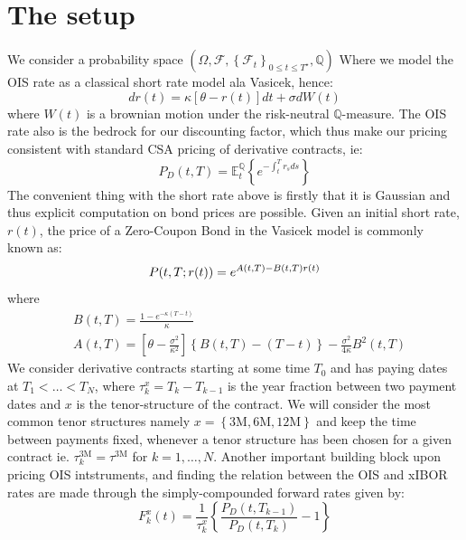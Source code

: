 \documentclass[12pt]{article}
\begin{document}
\section{The setup} %
\label{sec:the_setup}
We consider a probability space $(\Omega, \mathcal{F}, \left\{ \mathcal{F}_t \right\}_{0 \leq t \leq T^\star} , \mathbb{Q})$
Where we model the OIS rate as a classical short rate model ala Vasicek, hence:
\begin{equation}\label{eq:vasicekdynamics}
    dr(t) = \kappa \left[\theta - r(t) \right]dt + \sigma d W(t)
\end{equation}
where $W(t)$ is a
brownian motion under the risk-neutral $\mathbb{Q}$-measure.
The OIS rate also is the bedrock for our discounting factor,
which thus make our pricing consistent with
standard CSA pricing of derivative contracts, ie:
\begin{equation}
    P_D(t,T) = \mathbb{E}^\mathbb{Q}_t \left\{ e ^{- \int_{t}^{T}r_s ds} \right\}
\end{equation}
The convenient thing with the short rate above
is firstly that it is Gaussian and thus explicit computation
on bond prices are possible.
Given an initial short rate, $r(t)$,
the price of a Zero-Coupon Bond
 in the Vasicek model is
commonly known as:
\begin{equation}\label{eq:VasicekZCB}
    \notag P(t,T ; r(t)) = e ^{A(t,T) - B(t,T) r(t)}
\end{equation}
where
\begin{equation}\label{eq:AffineVasicek}
    \begin{aligned}
       & B(t,T) = \frac{1 - e ^{-\kappa(T-t)}}{\kappa} \\
       & A(t,T) = \left[\theta -
       \frac{\sigma^2}{\kappa^2}\right]
       \left\{ B(t,T) - (T-t) \right\}
       - \frac{\sigma^2}{4\kappa}B^2(t,T)
    \end{aligned}
\end{equation}
We consider derivative contracts starting at some time $T_0$
and has paying dates at $T_1<\dots < T_N$, where
$\tau ^x_k = T_k - T _{k-1}$ is the year fraction between two payment dates
and $x$ is the tenor-structure of the contract.
We will consider the most common tenor structures
namely $x = \left\{ 3\text{M} , 6\text{M}  , 12\text{M} \right\}$
and keep the time between payments fixed, whenever a tenor structure has been
chosen for a given contract ie. $\tau^{3\text{M}}_k = \tau ^{3\text{M}}$
for $k = 1,\dots,N$.
Another important building block
upon pricing OIS intstruments, and finding
the relation between the OIS and xIBOR rates are
made through the simply-compounded forward
rates given by:
\begin{equation}
    F_k^x (t) = \frac{1}{\tau_k^x} \left\{ \frac{P_D(t,T_{k-1})}{P_D(t,T_k)}-1 \right\}
\end{equation}
\end{document}
